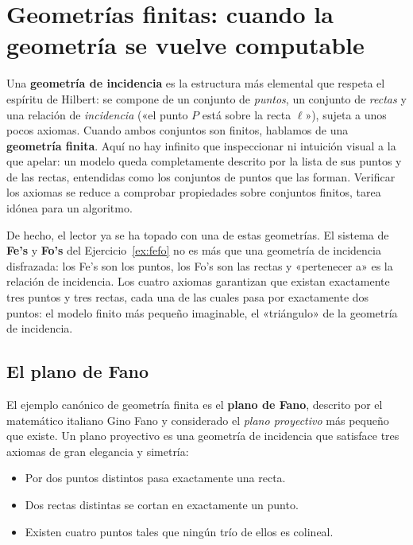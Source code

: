 \section{Geometrías finitas: cuando la geometría se vuelve computable}

Una \textbf{geometría de incidencia} es la estructura más elemental que respeta el
espíritu de Hilbert: se compone de un conjunto de \emph{puntos}, un conjunto de \emph{rectas} y una relación de
\emph{incidencia} («el punto $P$ está sobre la recta $\ell$»), sujeta a unos pocos axiomas. Cuando ambos conjuntos son
finitos, hablamos de una \textbf{geometría finita}. Aquí no hay infinito que inspeccionar ni
intuición visual a la que apelar: un modelo queda completamente descrito por la lista de sus puntos y de las rectas,
entendidas como los conjuntos de puntos que las forman. Verificar los axiomas se reduce a comprobar propiedades sobre
conjuntos finitos, tarea idónea para un algoritmo.

De hecho, el lector ya se ha topado con una de estas geometrías. El sistema de \textbf{Fe's} y \textbf{Fo's} del
Ejercicio~\ref{ex:fefo} no es más que una geometría de incidencia disfrazada: los Fe's son los puntos, los Fo's son las
rectas y «pertenecer a» es la relación de incidencia. Los cuatro axiomas garantizan que existan exactamente tres puntos
y tres rectas, cada una de las cuales pasa por exactamente dos puntos: el modelo finito más pequeño imaginable, el
«triángulo» de la geometría de incidencia.

\subsection{El plano de Fano}

El ejemplo canónico de geometría finita es el \textbf{plano de Fano}, descrito por el matemático
italiano Gino Fano y considerado el \emph{plano proyectivo} más pequeño que existe. Un plano proyectivo es una
geometría de incidencia que satisface tres axiomas de gran elegancia y simetría:

\begin{itemize}
    \item[\textbf{(P1)}] Por dos puntos distintos pasa exactamente una recta.
    \item[\textbf{(P2)}] Dos rectas distintas se cortan en exactamente un punto.
    \item[\textbf{(P3)}] Existen cuatro puntos tales que ningún trío de ellos es colineal.
\end{itemize}

